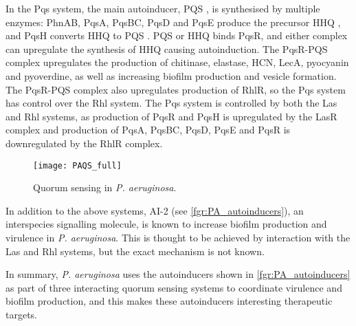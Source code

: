 In the Pqs system, the main autoinducer, PQS \cite{Pesci1999}, is synthesised by multiple enzymes:
PhnAB\cite{Farrow2007}, PqsA, PqsBC, PqsD\cite{Lepine2003,Lepine2004} and PqsE\cite{Drees2015,Lin2018} produce the precursor HHQ , and PqsH converts HHQ  to PQS . 
PQS \cite{Wade2005} or HHQ  binds PqsR\cite{Xiao2006}, and either complex can upregulate the synthesis of HHQ  causing autoinduction. 
The PqsR-PQS complex upregulates the production of 
chitinase\cite{Deziel2005}, elastase\cite{Pesci1999}, HCN\cite{Deziel2005}, LecA\cite{Diggle2003}, pyocyanin\cite{Gallagher2002,Diggle2007} and pyoverdine\cite{Diggle2007}, as well as increasing biofilm production\cite{Diggle2003} and vesicle formation\cite{Mashburn2009}.
The PqsR-PQS complex also upregulates production of RhlR, so the Pqs system has control over the Rhl system\cite{McKnight2000}.
The Pqs system is controlled by both the Las and Rhl systems,
as production of PqsR\cite{Wade2005} and PqsH\cite{Gallagher2002} is upregulated by the LasR complex and 
production of PqsA, PqsBC, PqsD, PqsE\cite{McGrath2004} and PqsR\cite{Wade2005} is downregulated by the RhlR complex.


\begin{figure}[H]
	\begin{center}
		\texttt{[image: PAQS\_full]}
		\caption{Quorum sensing in \textit{P. aeruginosa}\cite{Dubern2008,Hodgkinson2011,Jimenez2012}. \label{fgr:PA_QS}}
	\end{center}
\end{figure}


In addition to the above systems, AI-2 (see \ref{fgr:PA_autoinducers}), an interspecies signalling molecule\cite{Pereira2013}, is known to increase biofilm production and virulence in \textit{P. aeruginosa}\cite{Li2015a,Li2017}. This is thought to be achieved by interaction with the Las and Rhl systems, but the exact mechanism is not known.

In summary, \textit{P. aeruginosa} uses the autoinducers shown in \ref{fgr:PA_autoinducers} as part of three interacting quorum sensing systems to coordinate virulence and biofilm production, and this makes these autoinducers interesting therapeutic targets. 




